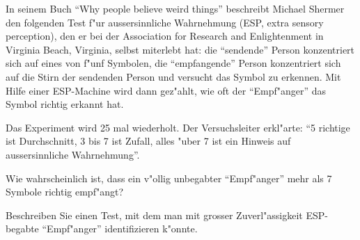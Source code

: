 In seinem Buch ``Why people believe weird things'' beschreibt Michael
Shermer den folgenden Test f"ur aussersinnliche Wahrnehmung
(ESP, extra sensory perception), den er bei der Association for Research and Enlightenment in Virginia Beach, Virginia, selbst miterlebt hat:
die ``sendende'' Person konzentriert sich
auf eines von f"unf Symbolen, die ``empfangende'' Person konzentriert sich 
auf die Stirn der sendenden Person und versucht das Symbol zu erkennen.
Mit Hilfe einer ESP-Machine wird dann gez"ahlt, wie oft der ``Empf"anger''
das Symbol richtig erkannt hat.
\begin{center}
\end{center}
Das Experiment wird 25 mal wiederholt. Der Versuchsleiter erkl"arte:
``5 richtige ist Durchschnitt, 3 bis 7 ist Zufall,
alles "uber 7 ist ein Hinweis auf aussersinnliche Wahrnehmung''.
\begin{teilaufgaben}
\item Wie wahrscheinlich ist, dass ein v"ollig unbegabter ``Empf"anger''
mehr als 7 Symbole richtig empf"angt?
\item Beschreiben Sie einen Test, mit dem man mit grosser Zuverl"assigkeit
ESP-begabte ``Empf"anger'' identifizieren k"onnte.
\end{teilaufgaben}

